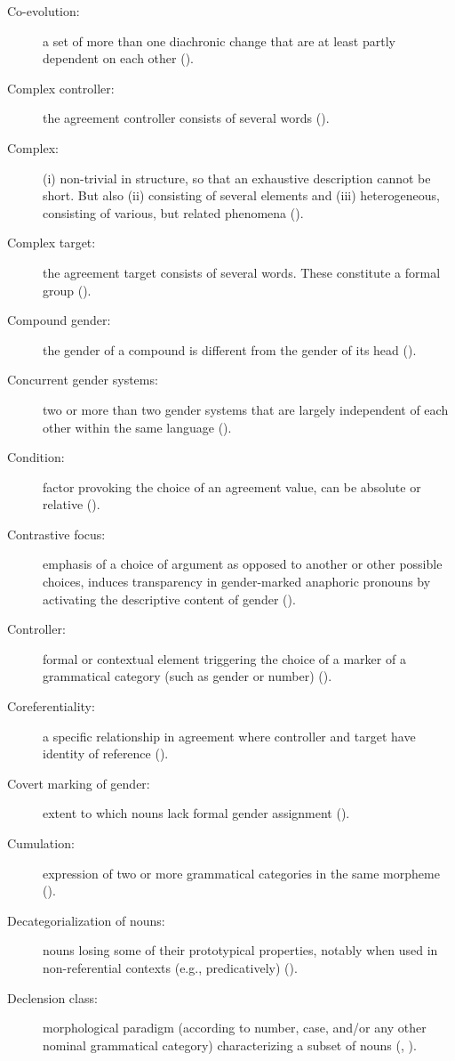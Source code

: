 \documentclass[output=collectionpaper]{langsci/langscibook}
\begin{document}
{\begin{description}
\item  [Co-evolution:] a set of more than one diachronic change that are at least partly dependent on each other ().
\item  [Complex controller:] the agreement controller consists of several words ().
\item  [Complex:] (i) non-trivial in structure, so that an exhaustive description cannot be short. But also (ii) consisting of several elements and (iii) heterogeneous, consisting of various, but related phenomena ().
\item  [Complex target:] the agreement target consists of several words. These constitute a formal group ().
\item  [Compound gender:] the gender of a compound is different from the gender of its head ().
\item  [Concurrent gender systems:] two or more than two gender systems that are largely independent of each other within the same language ().
\item  [Condition:] factor provoking the choice of an agreement value, can be absolute or relative ().
%
\item  [Contrastive focus:] emphasis of a choice of argument as opposed to another or other possible choices, induces transparency in gender-marked anaphoric pronouns by activating the descriptive content of gender ().
\item  [Controller:] formal or contextual element triggering the choice of a marker of a grammatical category (such as gender or number) ().
\item  [Coreferentiality:] a specific relationship in agreement where controller and target have identity of reference ().
\item  [Covert marking of gender:] extent to which nouns lack formal gender assignment ().
\item  [Cumulation:] expression of two or more grammatical categories in the same morpheme ().
\item  [Decategorialization of nouns:] nouns losing some of their prototypical properties, notably when used in non-referential contexts (e.g., predicatively) ().
\item  [Declension class:] morphological paradigm (according to number, case, and/or any other nominal grammatical category) characterizing a subset of nouns (, ).

\end{description}}
\end{document}
